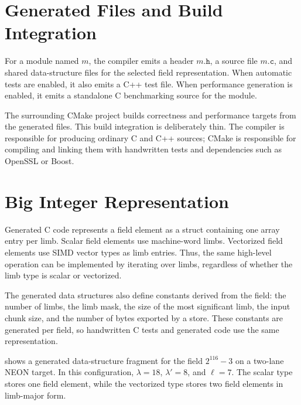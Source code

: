 \section{Generated Files and Build Integration}
\label{sec:generated-files}

For a module named \(m\), the compiler emits a header \(m\texttt{.h}\), a source file \(m\texttt{.c}\), and shared data-structure files for the selected field representation. When automatic tests are enabled, it also emits a C++ test file. When performance generation is enabled, it emits a standalone C benchmarking source for the module.

The surrounding CMake project builds correctness and performance targets from the generated files. This build integration is deliberately thin. The compiler is responsible for producing ordinary C and C++ sources; CMake is responsible for compiling and linking them with handwritten tests and dependencies such as OpenSSL or Boost.

\section{Big Integer Representation}
\label{sec:bigint-representation}

Generated C code represents a field element as a struct containing one array entry per limb. Scalar field elements use machine-word limbs. Vectorized field elements use SIMD vector types as limb entries. Thus, the same high-level operation can be implemented by iterating over limbs, regardless of whether the limb type is scalar or vectorized.

The generated data structures also define constants derived from the field: the number of limbs, the limb mask, the size of the most significant limb, the input chunk size, and the number of bytes exported by a store. These constants are generated per field, so handwritten C tests and generated code use the same representation.

 shows a generated data-structure fragment for the field \(2^{116}-3\) on a two-lane NEON target. In this configuration, \(\lambda=18\), \(\lambda'=8\), and \(\ell=7\). The scalar type stores one field element, while the vectorized type stores two field elements in limb-major form.

